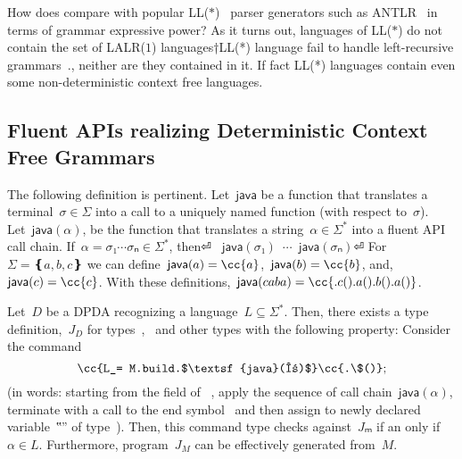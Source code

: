 How does \Self compare
with popular LL($*$)~\cite{Parr:2011} parser generators such
  as ANTLR~\cite{Parr:1995}
in terms of grammar expressive power?
  As it turns out, languages of LL($*$) do not contain the set
    of LALR($1$) languages†{LL(*) language fail to handle left-recursive
    grammars~\cite{Parr:2011}.},
neither are they contained in it. If fact LL(*) languages
  contain even some non-deterministic context free languages.

\subsection{Fluent APIs realizing Deterministic Context Free Grammars}
The following definition is pertinent.
Let~$\textsf{java}$ be a function that translates a terminal~$σ∈Σ$
into a call to a uniquely named function (with respect to~$σ$).
Let~$\textsf{java}(α)$, be the function
  that translates a string~$α∈Σ^*$ into a fluent API call chain.
If~$α=σ₁⋯σₙ∈Σ^*$, then⏎
  \mbox{\qquad\qquad}~$\textsf{java}(σ₁)$~$⋯$~$\textsf{java}(σₙ)$\cc{()}⏎
For~$Σ=❴a,b,c❵$ we can define~$\textsf{java}(a)=\cc{a}$,~$\textsf{java}(b)=\cc{b}$, and,~$\textsf{java}(c)=\cc{c}$.
With these definitions,~$\textsf{java}(caba) = \cc{.c().a().b().a()}$.

\begin{theorem}\label{Theorem:Gil-Levy}
  Let~$D$ be a DPDA recognizing a language~$L⊆Σ^*$.
  Then, there exists a \Java type definition,~$J_D$ for types~,~ and other types with the following
  property: Consider the \Java command
  \[
    \cc{L_= M.build.$\textsf{java}(α)$}\cc{.\$()};
  \]
  (in words: starting from the  field of ~,
  apply the sequence of call chain~$\textsf{java}(α)$, terminate with a call to the
  end symbol~\cc{\$()} and then assign to newly declared variable~‟\cc{\_}” of type~).
  Then, this command type checks against~$Jₘ$ if an only if~$α∈L$.
  Furthermore, program~$J_M$ can be effectively generated from~$M$.
\end{theorem}
